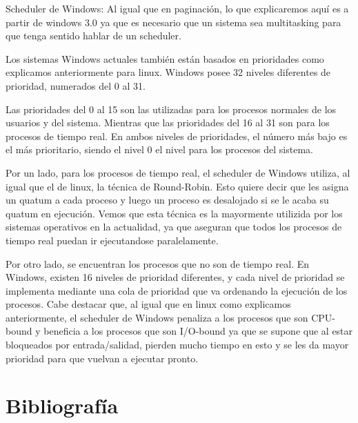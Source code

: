 \documentclass[a4paper, 12pt]{article}
\begin{document}
\bigskip


Scheduler de Windows: Al igual que en paginaci\'on, lo que explicaremos aqu\'i es a partir de windows 3.0 ya que es necesario que un sistema sea multitasking para que tenga sentido hablar de un scheduler.

Los sistemas Windows actuales tambi\'en est\'an basados en prioridades como explicamos anteriormente para linux. Windows posee 32 niveles diferentes de prioridad, numerados del 0 al 31.

Las prioridades del 0 al 15 son las utilizadas para los procesos normales de los usuarios y del sistema. Mientras que las prioridades del 16 al 31 son para los procesos de tiempo real. En ambos niveles de prioridades, el n\'umero m\'as bajo es el m\'as prioritario, siendo el nivel 0 el nivel para los procesos del sistema.

Por un lado, para los procesos de tiempo real, el scheduler de Windows utiliza, al igual que el de linux, la t\'ecnica de Round-Robin. Esto quiere decir que les asigna un quatum a cada proceso y luego un proceso es desalojado si se le acaba su quatum en ejecuci\'on. Vemos que esta t\'ecnica es la mayormente utilizida por los sistemas operativos en la actualidad, ya que aseguran que todos los procesos de tiempo real puedan ir ejecutandose paralelamente. 

Por otro lado, se encuentran los procesos que no son de tiempo real. En Windows, existen 16 niveles de prioridad diferentes, y cada nivel de prioridad se implementa mediante una cola de prioridad que va ordenando la ejecuci\'on de los procesos. Cabe destacar que, al igual que en linux como explicamos anteriormente, el scheduler de Windows penaliza a los procesos que son CPU-bound y beneficia a los procesos que son I/O-bound ya que se supone que al estar bloqueados por entrada/salidad, pierden mucho tiempo en esto y se les da mayor prioridad para que vuelvan a ejecutar pronto.







\section*{Bibliograf\'ia}
\end{document}
